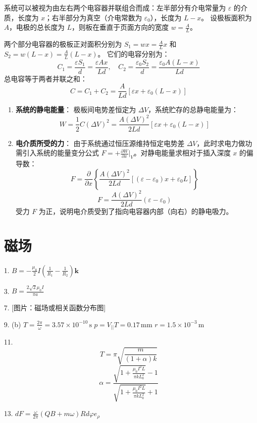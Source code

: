 \begin{solution}
系统可以被视为由左右两个电容器并联组合而成：左半部分有介电常量为 $\varepsilon$ 的介质，长度为 $x$；右半部分为真空（介电常数为 $\varepsilon_0$），长度为 $L - x$。
设极板面积为 $A$，电极的总长度为 $L$，则板在垂直于页面方向的宽度 $w = \frac{A}{L}$。

两个部分电容器的极板正对面积分别为 $S_1 = w x = \frac{A}{L} x$ 和 $S_2 = w (L - x) = \frac{A}{L} (L - x)$。
它们的电容分别为：
$$ C_1 = \frac{\varepsilon S_1}{d} = \frac{\varepsilon A x}{L d}, \quad C_2 = \frac{\varepsilon_0 S_2}{d} = \frac{\varepsilon_0 A (L - x)}{L d} $$
总电容等于两者并联之和：
$$ C = C_1 + C_2 = \frac{A}{L d} \left[ \varepsilon x + \varepsilon_0 (L - x) \right] $$

\begin{enumerate}
  \item[(a)] \textbf{系统的静电能量}：
  极板间电势差恒定为 $\Delta V$，系统贮存的总静电能量为：
  $$ W = \frac{1}{2} C (\Delta V)^2 = \frac{A (\Delta V)^2}{2L d} \left[ \varepsilon x + \varepsilon_0 (L - x) \right] $$

  \item[(b)] \textbf{电介质所受的力}：
  由于系统通过恒压源维持恒定电势差 $\Delta V$，此时求电力做功需引入系统的能量变分公式 $F = +\frac{\partial W}{\partial x}\Big|_{V}$。对静电能量求相对于插入深度 $x$ 的偏导数：
  $$ F = \frac{\partial}{\partial x} \left\{ \frac{A (\Delta V)^2}{2L d} \left[ (\varepsilon - \varepsilon_0)x + \varepsilon_0 L \right] \right\} $$
  $$ F = \frac{A (\Delta V)^2}{2 L d} (\varepsilon - \varepsilon_0) $$
  受力 $F$ 为正，说明电介质受到了指向电容器内部（向右）的静电吸力。
\end{enumerate}
\end{solution}



\chapter{磁场}

\begin{oddanswers}
1. $B = -\frac{\mu_0}{2} I \left( \frac{1}{R_1} - \frac{1}{R_2} \right) \mathbf{k}$

3. $B = \frac{2\sqrt{2}\mu_0 I}{\pi a}$

7. [图片：磁场或相关函数分布图]

9. (b) $T = \frac{2\pi}{\omega} = 3.57 \times 10^{-10}\,\mathrm{s}$
$p = V_{||} T = 0.17\,\mathrm{mm}$
$r = 1.5 \times 10^{-3}\,\mathrm{m}$

11. 
$$T = \pi \sqrt{\frac{m}{(1+\alpha)k}}$$
$$\alpha = \frac{\sqrt{1 + \frac{\mu_0 I^2 L}{\pi k L_0^2}} - 1}{\sqrt{1 + \frac{\mu_0 I^2 L}{\pi k L_0^2}} + 1}$$

13. $dF = \frac{\omega}{2\pi}(QB + m\omega)Rd\varphi e_\rho$
\end{oddanswers}

